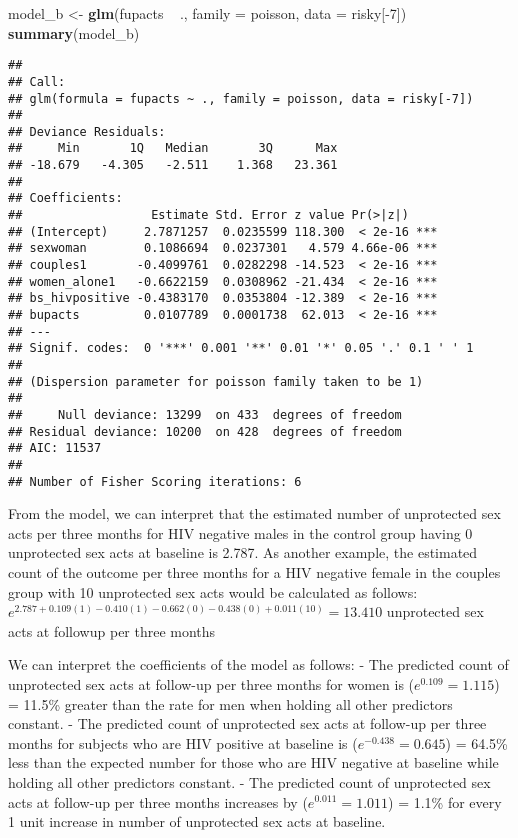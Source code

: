 \documentclass[]{article}
\newenvironment{Shaded}{\begin{snugshade}}{\end{snugshade}}
\newcommand{\KeywordTok}[1]{\textcolor[rgb]{0.13,0.29,0.53}{\textbf{{#1}}}}
\newcommand{\DataTypeTok}[1]{\textcolor[rgb]{0.13,0.29,0.53}{{#1}}}
\newcommand{\DecValTok}[1]{\textcolor[rgb]{0.00,0.00,0.81}{{#1}}}
\newcommand{\StringTok}[1]{\textcolor[rgb]{0.31,0.60,0.02}{{#1}}}
\newcommand{\NormalTok}[1]{{#1}}
\begin{document}
\begin{Shaded}
\begin{Highlighting}[]
\NormalTok{model_b <-}\StringTok{ }\KeywordTok{glm}\NormalTok{(fupacts ~}\StringTok{ }\NormalTok{., }\DataTypeTok{family =} \NormalTok{poisson, }\DataTypeTok{data =} \NormalTok{risky[-}\DecValTok{7}\NormalTok{])}
\KeywordTok{summary}\NormalTok{(model_b)}
\end{Highlighting}
\end{Shaded}

\begin{verbatim}
## 
## Call:
## glm(formula = fupacts ~ ., family = poisson, data = risky[-7])
## 
## Deviance Residuals: 
##     Min       1Q   Median       3Q      Max  
## -18.679   -4.305   -2.511    1.368   23.361  
## 
## Coefficients:
##                  Estimate Std. Error z value Pr(>|z|)    
## (Intercept)     2.7871257  0.0235599 118.300  < 2e-16 ***
## sexwoman        0.1086694  0.0237301   4.579 4.66e-06 ***
## couples1       -0.4099761  0.0282298 -14.523  < 2e-16 ***
## women_alone1   -0.6622159  0.0308962 -21.434  < 2e-16 ***
## bs_hivpositive -0.4383170  0.0353804 -12.389  < 2e-16 ***
## bupacts         0.0107789  0.0001738  62.013  < 2e-16 ***
## ---
## Signif. codes:  0 '***' 0.001 '**' 0.01 '*' 0.05 '.' 0.1 ' ' 1
## 
## (Dispersion parameter for poisson family taken to be 1)
## 
##     Null deviance: 13299  on 433  degrees of freedom
## Residual deviance: 10200  on 428  degrees of freedom
## AIC: 11537
## 
## Number of Fisher Scoring iterations: 6
\end{verbatim}

From the model, we can interpret that the estimated number of
unprotected sex acts per three months for HIV negative males in the
control group having 0 unprotected sex acts at baseline is 2.787. As
another example, the estimated count of the outcome per three months for
a HIV negative female in the couples group with 10 unprotected sex acts
would be calculated as follows:
\(e ^ {2.787 + 0.109(1) - 0.410(1) - 0.662(0) - 0.438(0) + 0.011(10)} = 13.410\)
unprotected sex acts at followup per three months

We can interpret the coefficients of the model as follows: - The
predicted count of unprotected sex acts at follow-up per three months
for women is (\(e^{0.109}=1.115\)) = 11.5\% greater than the rate for
men when holding all other predictors constant. - The predicted count of
unprotected sex acts at follow-up per three months for subjects who are
HIV positive at baseline is (\(e^{-0.438}=0.645\)) = 64.5\% less than
the expected number for those who are HIV negative at baseline while
holding all other predictors constant. - The predicted count of
unprotected sex acts at follow-up per three months increases by
(\(e^{0.011}=1.011\)) = 1.1\% for every 1 unit increase in number of
unprotected sex acts at baseline.
\end{document}
